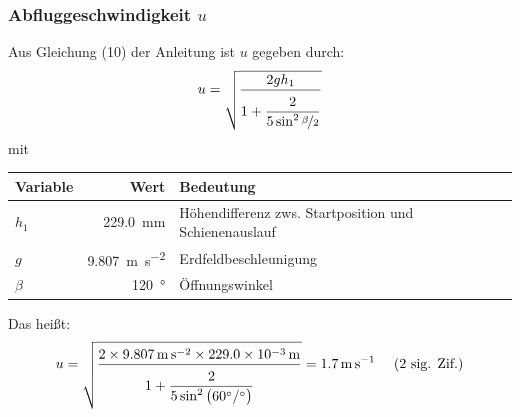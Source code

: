 \documentclass[twoside]{article}
\begin{document}
        \subsubsection{Abfluggeschwindigkeit $u$}
            Aus Gleichung (10) der Anleitung ist $u$ gegeben durch:
            \begin{equation}
                u = \sqrt{\frac{2gh_1}{1 + \displaystyle \frac{\rule{0pt}{1em} 2}{5 \sin^2 \nicefrac{\beta}{2}}}}
            \end{equation}
            mit
            \begin{center}
                \begin{tabular}{lrl}
                    \toprule
                    Variable & Wert & Bedeutung \\
                    \midrule
                    $h_1$ & \SI{229.0}{\milli\meter} & Höhendifferenz zws. Startposition und Schienenauslauf \\
                    $g$ & \SI{9.807}{\meter\per\second\squared} & Erdfeldbeschleunigung \\
                    $\beta$ & \SI{120}{\degree} & Öffnungswinkel \\
                    \bottomrule
                \end{tabular}
            \end{center}
            Das heißt:
            \begin{equation}
                u = \sqrt{\frac{2\times \SI{9.807}{\meter\per\second\squared} \times \SI{229.0e-3}{\meter}}{1 + \displaystyle \frac{\rule{0pt}{1em} 2}{5 \sin^2 \left(\SI{60}{\degree}/\SI{}{\degree}\right)}}} = \SI{1.7}{\meter\per\second} \text{~~~~(2 sig. Zif.)}
            \end{equation}
\end{document}
